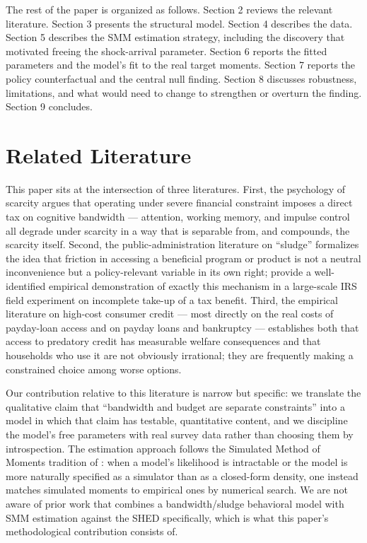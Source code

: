 \documentclass[12pt]{article}
\begin{document}
The rest of the paper is organized as follows. Section 2 reviews the relevant literature. Section 3 presents the structural model. Section 4 describes the data. Section 5 describes the SMM estimation strategy, including the discovery that motivated freeing the shock-arrival parameter. Section 6 reports the fitted parameters and the model's fit to the real target moments. Section 7 reports the policy counterfactual and the central null finding. Section 8 discusses robustness, limitations, and what would need to change to strengthen or overturn the finding. Section 9 concludes.

\section{Related Literature}

This paper sits at the intersection of three literatures. First, the psychology of scarcity \cite{mullainathan2013scarcity} argues that operating under severe financial constraint imposes a direct tax on cognitive bandwidth — attention, working memory, and impulse control all degrade under scarcity in a way that is separable from, and compounds, the scarcity itself. Second, the public-administration literature on ``sludge'' \cite{sunstein2019sludge} formalizes the idea that friction in accessing a beneficial program or product is not a neutral inconvenience but a policy-relevant variable in its own right; \cite{bhargava2015psychological} provide a well-identified empirical demonstration of exactly this mechanism in a large-scale IRS field experiment on incomplete take-up of a tax benefit. Third, the empirical literature on high-cost consumer credit — most directly \cite{melzer2011real} on the real costs of payday-loan access and \cite{skiba2019payday} on payday loans and bankruptcy — establishes both that access to predatory credit has measurable welfare consequences and that households who use it are not obviously irrational; they are frequently making a constrained choice among worse options.

Our contribution relative to this literature is narrow but specific: we translate the qualitative claim that ``bandwidth and budget are separate constraints'' into a model in which that claim has testable, quantitative content, and we discipline the model's free parameters with real survey data rather than choosing them by introspection. The estimation approach follows the Simulated Method of Moments tradition of \cite{mcfadden1989method}: when a model's likelihood is intractable or the model is more naturally specified as a simulator than as a closed-form density, one instead matches simulated moments to empirical ones by numerical search. We are not aware of prior work that combines a bandwidth/sludge behavioral model with SMM estimation against the SHED specifically, which is what this paper's methodological contribution consists of.
\end{document}
